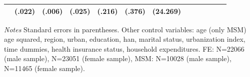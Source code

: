 \begin{table}[h]
\begin{adjustbox}{max width=\linewidth}
\begin{threeparttable}
{\begin{tabular}{l*{6}{SS}}
                &   (.022)         &   (.006)         &   (.025)         &   (.216)         &   (.376)         & (24.269)         \\                 
\bottomrule
\end{tabular}
\begin{tablenotes}
\item \textit{Notes}   Standard errors in parentheses.
Other control variables: age (only MSM) age squared, region, urban, education, han, marital status, urbanization index, time dummies, health insurance status, household expenditures. FE:  N=22066 (male sample), N=23051 (female sample), MSM: N=10028 (male sample), N=11465 (female sample).
\end{tablenotes}
}
\end{threeparttable}
\end{adjustbox}
\end{table}


